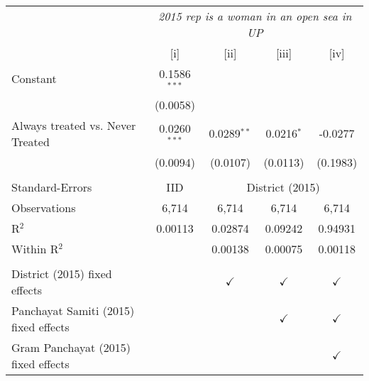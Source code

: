 
\begingroup
\centering
\begin{tabular}{lcccc}
   \toprule
    & \multicolumn{4}{c}{\textit{2015 rep is a woman in an open sea in UP}}\\
                                         & [i]            & [ii]          & [iii]         & [iv]\\  
   \midrule 
   Constant                              & 0.1586$^{***}$ &               &               &   \\   
                                         & (0.0058)       &               &               &   \\   
   Always treated vs. Never Treated      & 0.0260$^{***}$ & 0.0289$^{**}$ & 0.0216$^{*}$  & -0.0277\\   
                                         & (0.0094)       & (0.0107)      & (0.0113)      & (0.1983)\\   
    \\
   Standard-Errors & IID & \multicolumn{3}{c}{District (2015)} \\ 
   Observations                          & 6,714          & 6,714         & 6,714         & 6,714\\  
   R$^2$                                 & 0.00113        & 0.02874       & 0.09242       & 0.94931\\  
   Within R$^2$                          &                & 0.00138       & 0.00075       & 0.00118\\  
    \\
   District (2015) fixed effects         &                & $\checkmark$  & $\checkmark$  & $\checkmark$\\   
   Panchayat Samiti (2015) fixed effects &                &               & $\checkmark$  & $\checkmark$\\   
   Gram Panchayat (2015) fixed effects   &                &               &               & $\checkmark$\\   
   \bottomrule
\end{tabular}
\par\endgroup


